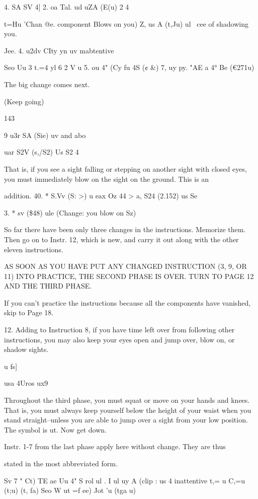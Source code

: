 \documentclass[10pt,twoside]{memoir}
\begin{document}
\begin{enumerate}
{\begin{enumerate}
\begin{sysrules}
\begin{sysrules}
\begin{sysrules}
\begin{sysrules}
{\begin{enumerate}
\begin{sysrules}
\begin{enumerate}
4. SA SV 4] 2. oa Tal. ud 
uZA (E(u) 2 4%


t=Hu 'Chan @e. component Blows on you) 
Z, us A (t,Ju) ul \ cee of shadowing you. 


Jee. 
4. u2dv CIty yn 
uv mabtentive 


Seo Uu 
3 t.=4 yl 6 2 V u 
5. ou 4" (Cy fu 4S (¢ &) 
7, uy py. "AE a 4° Be 
(€271u) 


The big change comes next. 


(Keep going) 


143 


9 u3r SA (Sie) uv and abo 


uar S2V (s,/S2) Us S2 
4 


That is, if you see a sight falling or stepping on another sight with closed 
eyes, you must immediately blow on the sight on the ground. This is an 


addition. 
40. 
* S.Vv (S: >) u eax Oz 
44 > 
a, S24 (2.152) us Se 


3. 
* sv (\$48) ule 
(Change: you blow on Sz) 


So far there have been only three changes in the instructions. Memorize 
them. Then go on to Instr. 12, which is new, and carry it out along with the 
other eleven instructions. 


AS SOON AS YOU HAVE PUT ANY CHANGED INSTRUCTION (3, 
9, OR 11) INTO PRACTICE, THE SECOND PHASE IS OVER. TURN TO 
PAGE 12 AND THE THIRD PHASE. 


If you can't practice the instructions because all the components have 
vanished, skip to Page 18. 


12. Adding to Instruction 8, if you have time left over from following 
other instructions, you may also keep your eyes open and jump over, blow 
on, or shadow sights. 


u fs] 


usa 4Uros 
ux9 


Throughout the third phase, you must squat or move on your hands 
and knees. That is, you must always keep yourself below the height of your 
waist when you stand straight--unless you are able to jump over a sight from 
your low position. The symbol is ut. Now get down. 

Instr. 1-7 from the last phase apply here without change. They are thus 


stated in the most abbreviated form. 


Sv 7 
" Ct) TE ae 
Uu 4" S rol ul . I ul uy A 
(clip : us 4 inattentive 
t,= u C,=u 
(t;u) (t, fa) 
Seo W ut =f 
ee) 
Jot 'u 
(tga u) 



\end{enumerate}
\end{sysrules}
\end{enumerate}}
\end{sysrules}
\end{sysrules}
\end{sysrules}
\end{sysrules}
\end{enumerate}}
\end{enumerate}
\end{document}

